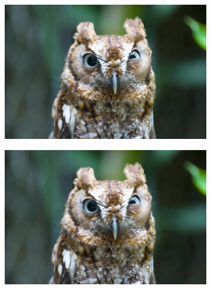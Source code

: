 \begin{figure}[htbp]
    \centering
   \begin{subfigure}[b]{0.48\textwidth}
        \includegraphics[width= \textwidth]{./Figs/placeholder.jpeg}
    \end{subfigure}
    \begin{subfigure}[b]{0.48\textwidth}
       \includegraphics[width=\textwidth]{./Figs/placeholder.jpeg}
   \end{subfigure}
    \caption{}
    \label{fig:accpteg}
\end{figure}

